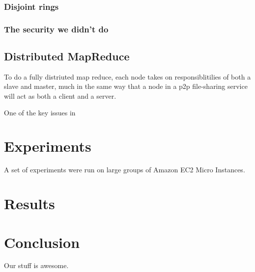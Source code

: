 \documentclass[conference, compsocconf, letterpaper]{IEEEtran}
\begin{document}
\subsubsection{Disjoint rings}

\subsubsection{The security we didn't do}


\subsection{Distributed MapReduce}
To do a fully distriuted map reduce, each node takes on responsiblitilies of both a slave and master, much in the same way that a node in a p2p file-sharing service will act as both a client and a server.   

One of the key issues in


\section{Experiments}
A set of experiments were run on large groups of Amazon EC2 Micro Instances\cite{amazon-micro}.
\section{Results}

\section{Conclusion}
Our stuff \cite{code} is awesome.



\end{document}
